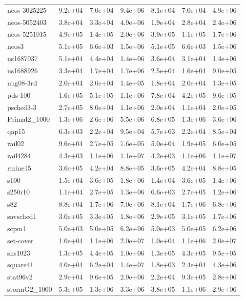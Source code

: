\documentclass[a4paper]{article}
\newcommand{\0}{\mathbf 0}
\begin{document}
{\begin{longtable}{l|rrr|rrr}
neos-3025225 & 9.2e+04 & 7.0e+04 & 9.4e+06 & 8.1e+04 & 7.0e+04 & 4.9e+06 \\
neos-5052403 & 3.8e+04 & 3.3e+04 & 4.9e+06 & 1.9e+04 & 2.8e+04 & 2.4e+06 \\
neos-5251015 & 4.9e+05 & 1.4e+05 & 2.0e+06 & 3.9e+05 & 1.1e+05 & 1.7e+06 \\
neos3 & 5.1e+05 & 6.6e+03 & 1.5e+06 & 5.1e+05 & 6.6e+03 & 1.5e+06 \\
ns1687037 & 5.1e+04 & 4.4e+04 & 1.4e+06 & 3.6e+04 & 3.1e+04 & 1.4e+06 \\
ns1688926 & 3.3e+04 & 1.7e+04 & 1.7e+06 & 2.5e+04 & 1.6e+04 & 9.0e+05 \\
nug08-3rd & 2.0e+04 & 2.0e+04 & 1.4e+05 & 1.8e+04 & 2.0e+04 & 1.3e+05 \\
pds-100 & 1.6e+05 & 5.1e+05 & 1.1e+06 & 7.8e+04 & 4.2e+05 & 9.6e+05 \\
psched3-3 & 2.7e+05 & 8.0e+04 & 1.1e+06 & 2.0e+04 & 1.1e+04 & 2.0e+05 \\
Primal2\_1000 & 1.3e+06 & 2.6e+06 & 5.5e+06 & 6.8e+05 & 1.3e+06 & 3.6e+06 \\
qap15 & 6.3e+03 & 2.2e+04 & 9.5e+04 & 5.7e+03 & 2.2e+04 & 8.5e+04 \\
rail02 & 9.6e+04 & 2.7e+05 & 7.6e+05 & 5.0e+04 & 1.9e+05 & 6.0e+05 \\
rail4284 & 4.3e+03 & 1.1e+06 & 1.1e+07 & 4.2e+03 & 1.1e+06 & 1.1e+07 \\
rmine15 & 3.6e+05 & 4.2e+04 & 8.8e+05 & 3.6e+05 & 4.2e+04 & 8.8e+05 \\
s100 & 1.5e+04 & 3.6e+05 & 1.8e+06 & 1.4e+04 & 3.6e+05 & 1.4e+06 \\
s250r10 & 1.1e+04 & 2.7e+05 & 1.3e+06 & 6.6e+03 & 2.7e+05 & 1.2e+06 \\
s82 & 8.8e+04 & 1.7e+06 & 7.0e+06 & 8.1e+04 & 1.7e+06 & 6.8e+06 \\
savsched1 & 3.0e+05 & 3.3e+05 & 1.8e+06 & 2.9e+05 & 3.1e+05 & 1.7e+06 \\
scpm1 & 5.0e+03 & 5.0e+05 & 6.2e+06 & 5.0e+03 & 5.0e+05 & 6.2e+06 \\
set-cover & 1.0e+04 & 1.1e+06 & 2.0e+07 & 1.0e+04 & 1.1e+06 & 2.0e+07 \\
shs1023 & 1.3e+05 & 4.4e+05 & 1.0e+06 & 1.3e+05 & 4.3e+05 & 9.5e+05 \\
square41 & 4.0e+04 & 6.2e+04 & 1.4e+07 & 1.8e+03 & 2.4e+04 & 4.3e+06 \\
stat96v2 & 2.9e+04 & 9.6e+05 & 2.9e+06 & 2.2e+04 & 9.3e+05 & 2.8e+06 \\
stormG2\_1000 & 5.3e+05 & 1.3e+06 & 3.3e+06 & 3.8e+05 & 1.1e+06 & 2.9e+06 \\

\end{longtable}}
\end{document}
